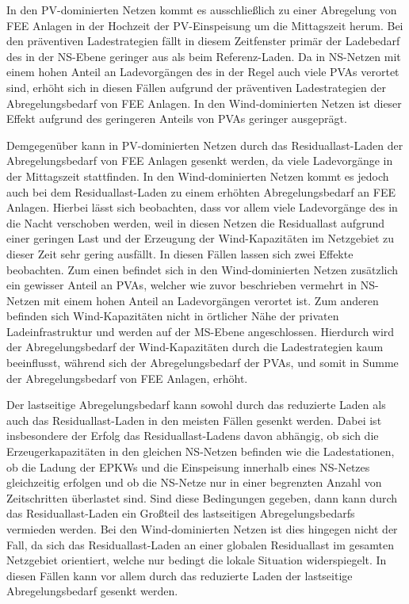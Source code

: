 In den \gls{PV}-dominierten Netzen kommt es ausschließlich zu einer Abregelung von \gls{FEE} Anlagen in der Hochzeit der \gls{PV}-Einspeisung um die Mittagszeit herum.
Bei den präventiven Ladestrategien fällt in diesem Zeitfenster primär der Ladebedarf des \UC \zH in der \gls{NS}-Ebene geringer aus als beim Referenz-Laden.
Da in \gls{NS}-Netzen mit einem hohen Anteil an Ladevorgängen des \UC \zH in der Regel auch viele \glspl{PVA} verortet sind, erhöht sich in diesen Fällen aufgrund der präventiven Ladestrategien der Abregelungsbedarf von \gls{FEE} Anlagen.
In den Wind-dominierten Netzen ist dieser Effekt aufgrund des geringeren Anteils von \glspl{PVA} geringer ausgeprägt.\medskip

Demgegenüber kann in \gls{PV}-dominierten Netzen durch das Residuallast-Laden der Abregelungsbedarf von \gls{FEE} Anlagen gesenkt werden, da viele Ladevorgänge in der Mittagszeit stattfinden.
In den Wind-dominierten Netzen kommt es jedoch auch bei dem Residuallast-Laden zu einem erhöhten Abregelungsbedarf an \gls{FEE} Anlagen.
Hierbei lässt sich beobachten, dass vor allem viele Ladevorgänge des \UC \zH in die Nacht verschoben werden, weil in diesen Netzen die Residuallast aufgrund einer geringen Last und der Erzeugung der Wind-Kapazitäten im Netzgebiet zu dieser Zeit sehr gering ausfällt.
In diesen Fällen lassen sich zwei Effekte beobachten.
Zum einen befindet sich in den Wind-dominierten Netzen zusätzlich ein gewisser Anteil an \glspl{PVA}, welcher wie zuvor beschrieben vermehrt in \gls{NS}-Netzen mit einem hohen Anteil an Ladevorgängen verortet ist.
Zum anderen befinden sich Wind-Kapazitäten nicht in örtlicher Nähe der privaten Ladeinfrastruktur und werden auf der \gls{MS}-Ebene angeschlossen.
Hierdurch wird der Abregelungsbedarf der Wind-Kapazitäten durch die Ladestrategien kaum beeinflusst, während sich der Abregelungsbedarf der \glspl{PVA}, und somit in Summe der Abregelungsbedarf von \gls{FEE} Anlagen, erhöht.\medskip

Der lastseitige Abregelungsbedarf kann sowohl durch das reduzierte Laden als auch das Residuallast-Laden in den meisten Fällen gesenkt werden.
Dabei ist insbesondere der Erfolg das Residuallast-Ladens davon abhängig, ob sich die Erzeugerkapazitäten in den gleichen \gls{NS}-Netzen befinden wie die Ladestationen, ob die Ladung der \glspl{EPKW} und die Einspeisung innerhalb eines \gls{NS}-Netzes gleichzeitig erfolgen und ob die \gls{NS}-Netze nur in einer begrenzten Anzahl von Zeitschritten überlastet sind.
Sind diese Bedingungen gegeben, dann kann durch das Residuallast-Laden ein Großteil des lastseitigen Abregelungsbedarfs vermieden werden.
Bei den Wind-dominierten Netzen ist dies hingegen nicht der Fall, da sich das Residuallast-Laden an einer globalen Residuallast im gesamten Netzgebiet orientiert, welche nur bedingt die lokale Situation widerspiegelt.
In diesen Fällen kann vor allem durch das reduzierte Laden der lastseitige Abregelungsbedarf gesenkt werden.\medskip

